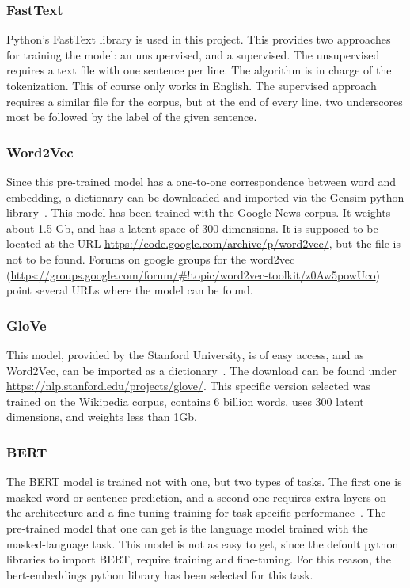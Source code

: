 \subsubsection{FastText}\label{subs:FastText}
Python's FastText library\cite{joulin2017fasttext} is used in this project. This provides two approaches for training the model: an unsupervised, and a supervised. The unsupervised requires a text file with one sentence per line. The algorithm is in charge of the tokenization. This of course only works in English. The supervised approach requires a similar file for the corpus, but at the end of every line, two underscores most be followed by the label of the given sentence.

\subsubsection{Word2Vec}\label{subs:Word2Vec}
Since this pre-trained model has a one-to-one correspondence between word and embedding, a dictionary can be downloaded and imported via the Gensim python library~\cite{mikolov2013word2vec}. This model has been trained with the Google News corpus. It weights about 1.5 Gb, and has a latent space of 300 dimensions. It is supposed to be located at the URL \url{https://code.google.com/archive/p/word2vec/}, but the file is not to be found. Forums on google groups for the word2vec (\url{https://groups.google.com/forum/#!topic/word2vec-toolkit/z0Aw5powUco}) point several URLs where the model can be found.

\subsubsection{GloVe}\label{subs:GloVe}
This model, provided by the Stanford University, is of easy access, and as Word2Vec, can be imported as a dictionary~\cite{penningto2014glove}. The download can be found under \url{https://nlp.stanford.edu/projects/glove/}. This specific version selected was trained on the Wikipedia corpus, contains 6 billion words, uses 300 latent dimensions, and weights less than 1Gb.

\subsubsection{BERT}\label{subs:BERT}
The BERT model is trained not with one, but two types of tasks. The first one is masked word or sentence prediction, and a second one requires extra layers on the architecture and a fine-tuning training for task specific performance~\cite{devlin2019bert}. The pre-trained model that one can get is the language model trained with the masked-language task. This model is not as easy to get, since the defoult python libraries to import BERT, require training and fine-tuning. For this reason, the bert-embeddings python library has been selected for this task.

